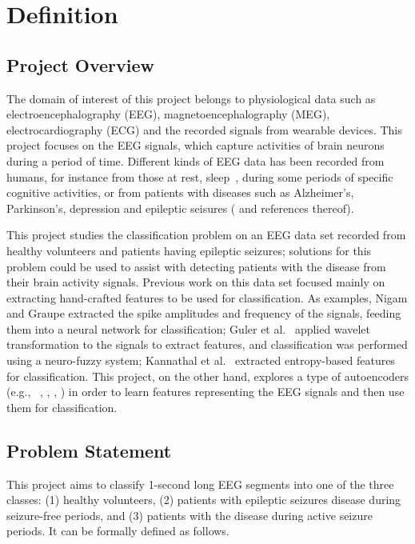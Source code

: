 \documentclass[12pt]{article}
\begin{document}
\maketitle

\section{Definition}

\subsection{Project Overview}
\noindent
The domain of interest of this project belongs to physiological data such as electroencephalography (EEG), magnetoencephalography (MEG), electrocardiography (ECG) and the recorded signals from wearable devices. This project focuses on the EEG signals, which capture activities of brain neurons during a period of time. Different kinds of EEG data has been recorded from humans, for instance from those at rest, sleep~\cite{langkvist2012sleep}, during some periods of specific cognitive activities, or from patients with diseases such as Alzheimer's, Parkinson's, depression and epileptic seisures (\cite{andrzejak2001indications} and references thereof).

This project studies the classification problem on an EEG data set recorded from healthy volunteers and patients having epileptic seizures; solutions for this problem could be used to assist with detecting patients with the disease from their brain activity signals. Previous work on this data set focused mainly on extracting hand-crafted features to be used for classification. As examples, Nigam and Graupe \cite{nigam2004neural} extracted the spike amplitudes and frequency of the signals, feeding them into a neural network for classification; Guler et al.~\cite{guler2005recurrent} applied wavelet transformation to the signals to extract features, and classification was performed using a neuro-fuzzy system; Kannathal et al.~\cite{kannathal2005entropies} extracted entropy-based features for classification. This project, on the other hand, explores a type of autoencoders (e.g., ~\cite{bengio2007greedy}, \cite{vincent2010stacked}, \cite{boureau2008sparse}, \cite{kingma2013auto}) in order to learn features representing the EEG signals and then use them for classification.

\subsection{Problem Statement}
\noindent
This project aims to classify 1-second long EEG segments into one of the three classes: (1) healthy volunteers, (2) patients with epileptic seizures disease during seizure-free periods, and (3) patients with the disease during active seizure periods. It can be formally defined as follows.
\end{document}
